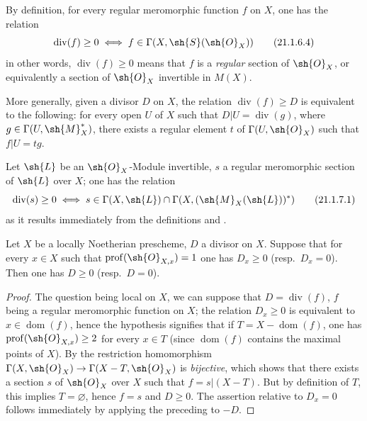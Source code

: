 By definition, for every regular meromorphic function $f$ on $X$, one has the relation
\[
\label{IV.21.1.6.4}
  \operatorname{div}(f)\geq 0\iff f\in\Gamma(X,\sh{S}(\sh{O}_X))
  \tag{21.1.6.4}
\]
in other words, $\operatorname{div}(f)\geq 0$ means that $f$ is a \emph{regular} section of $\sh{O}_X$, or equivalently a section of $\sh{O}_X$ invertible in $M(X)$.

More generally, given a divisor $D$ on $X$, the relation $\operatorname{div}(f)\geq D$ is equivalent to the following: for every open $U$ of $X$ such that $D|U=\operatorname{div}(g)$, where $g\in\Gamma(U,\sh{M}_X^*)$, there exists a regular element $t$ of $\Gamma(U,\sh{O}_X)$ such that $f|U=tg$.

\begin{env}[21.1.7]
\label{IV.21.1.7}
Let $\sh{L}$ be an $\sh{O}_X$-Module invertible, $s$ a regular meromorphic section of $\sh{L}$ over $X$;
one has the relation
\[
\label{IV.21.1.7.1}
  \operatorname{div}(s)\geq 0\iff s\in\Gamma(X,\sh{L})\cap\Gamma(X,(\sh{M}_X(\sh{L}))^*)
  \tag{21.1.7.1}
\]
as it results immediately from the definitions  and .
\end{env}

\begin{proposition}[21.1.8]
\label{IV.21.1.8}
Let $X$ be a locally Noetherian prescheme, $D$ a divisor on $X$.
Suppose that for every $x\in X$ such that $\operatorname{prof}(\sh{O}_{X,x})=1$ one has $D_x\geq 0$ (resp.\ $D_x=0$).
Then one has $D\geq 0$ (resp.\ $D=0$).
\end{proposition}

\begin{proof}
The question being local on $X$, we can suppose that $D=\operatorname{div}(f)$, $f$ being a regular meromorphic function on $X$;
the relation $D_x\geq 0$ is equivalent to $x\in\operatorname{dom}(f)$, hence the hypothesis signifies that if $T=X-\operatorname{dom}(f)$, one has $\operatorname{prof}(\sh{O}_{X,x})\geq 2$ for every $x\in T$ (since $\operatorname{dom}(f)$ contains the maximal points of $X$).
By  the restriction homomorphism $\Gamma(X,\sh{O}_X)\to\Gamma(X-T,\sh{O}_X)$ is \emph{bijective}, which shows that there exists a section $s$ of $\sh{O}_X$ over $X$ such that $f=s|(X-T)$.
But by definition of $T$, this implies $T=\varnothing$, hence $f=s$ and $D\geq 0$.
The assertion relative to $D_x=0$ follows immediately by applying the preceding to $-D$.
\end{proof}

